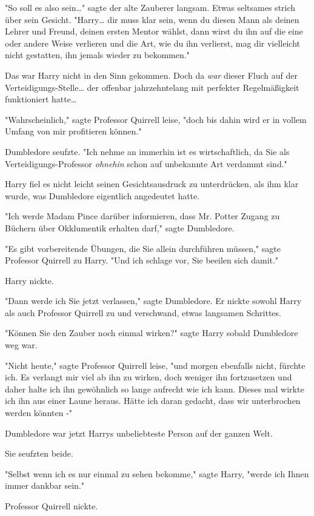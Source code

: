 {"So soll es also sein…" sagte der alte Zauberer langsam. Etwas seltsames strich über sein Gesicht. "Harry… dir muss klar sein, wenn du diesen Mann als deinen Lehrer und Freund, deinen ersten Mentor wählst, dann wirst du ihn auf die eine oder andere Weise verlieren und die Art, wie du ihn verlierst, mag dir vielleicht nicht gestatten, ihn jemals wieder zu bekommen."

Das war Harry nicht in den Sinn gekommen. Doch da \emph{war} dieser Fluch auf der Verteidigungs-Stelle… der offenbar jahrzehntelang mit perfekter Regelmäßigkeit funktioniert hatte…

"Wahrscheinlich," sagte Professor Quirrell leise, "doch bis dahin wird er in vollem Umfang von mir profitieren können."

Dumbledore seufzte. "Ich nehme an immerhin ist es wirtschaftlich, da Sie als Verteidigungs-Professor \emph{ohnehin} schon auf unbekannte Art verdammt sind."

Harry fiel es nicht leicht seinen Gesichtsausdruck zu unterdrücken, als ihm klar wurde, was Dumbledore eigentlich angedeutet hatte.

"Ich werde Madam Pince darüber informieren, dass Mr. Potter Zugang zu Büchern über Okklumentik erhalten darf," sagte Dumbledore.

"Es gibt vorbereitende Übungen, die Sie allein durchführen müssen," sagte Professor Quirrell zu Harry. "Und ich schlage vor, Sie beeilen sich damit."

Harry nickte.

"Dann werde ich Sie jetzt verlassen," sagte Dumbledore. Er nickte sowohl Harry als auch Professor Quirrell zu und verschwand, etwas langsamen Schrittes.

"Können Sie den Zauber noch einmal wirken?" sagte Harry sobald Dumbledore weg war.

"Nicht heute," sagte Professor Quirrell leise, "und morgen ebenfalls nicht, fürchte ich. Es verlangt mir viel ab ihn zu wirken, doch weniger ihn fortzusetzen und daher halte ich ihn gewöhnlich so lange aufrecht wie ich kann. Dieses mal wirkte ich ihn aus einer Laune heraus. Hätte ich daran gedacht, dass wir unterbrochen werden könnten -"

Dumbledore war jetzt Harrys unbeliebteste Person auf der ganzen Welt.

Sie seufzten beide.

"Selbst wenn ich es nur einmal zu sehen bekomme," sagte Harry, "werde ich Ihnen immer dankbar sein."

Professor Quirrell nickte.

}
